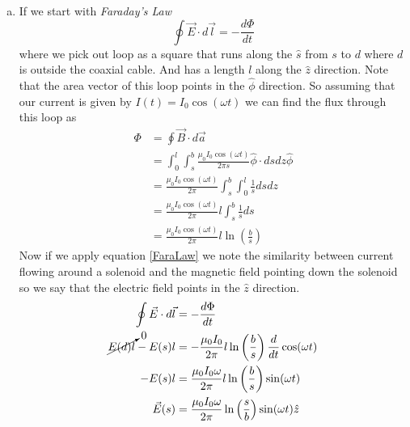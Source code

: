\documentclass[11pt]{article}
\numberwithin{equation}{section}
\begin{document}
\begin{enumerate}[(a)]
\item
If we start with \emph{Faraday's Law}
\begin{equation}
\oint\vec{E}\cdot d\vec{l} = -\frac{d\Phi}{dt}
\label{FaraLaw}
\end{equation}
where we pick out loop as a square that runs along the $\hat{s}$ from $s$ to $d$ where $d$ is outside the coaxial cable. And has a length $l$ along the $\hat{z}$ direction. Note that the area vector of this loop points in the $\hat{\phi}$ direction. So assuming that our current is given by $I(t) = I_0\cos(\omega t)$ we can find the flux through this loop as
\begin{align*} 
\Phi &= \oint\vec{B}\cdot d\vec{a}\\
&= \int_0^l\int_s^{b}\frac{\mu_0 I_0\cos(\omega t)}{2\pi s}\hat{\phi}\cdot dsdz\hat{\phi}\\
&= \frac{\mu_0 I_0\cos(\omega t)}{2\pi}\int_s^{b}\int_0^l\frac{1}{s}dsdz\\
&= \frac{\mu_0 I_0\cos(\omega t)}{2\pi}l\int_s^{b}\frac{1}{s}ds\\
&= \frac{\mu_0 I_0\cos(\omega t)}{2\pi}l\ln\left(\frac{b}{s}\right)
\end{align*} 
Now if we apply equation \ref{FaraLaw} we note the similarity between current flowing around a solenoid and the magnetic field pointing down the solenoid so we say that the electric field points in the $\hat{z}$ direction.
\begin{align*}
\oint\vec{E}\cdot d\vec{l} &= -\frac{d\Phi}{dt}\\
\cancelto{0}{E(d)l}-E(s)l &= -\frac{\mu_0 I_0}{2\pi}l\ln\left(\frac{b}{s}\right)\frac{d}{dt}\cos(\omega t)\\
-E(s)l &= \frac{\mu_0 I_0\omega}{2\pi}l\ln\left(\frac{b}{s}\right)\sin(\omega t)\\
\vec{E}(s) &= \frac{\mu_0 I_0\omega}{2\pi}\ln\left(\frac{s}{b}\right)\sin(\omega t)\hat{z}\\
\end{align*}


\end{enumerate}
\end{document}
